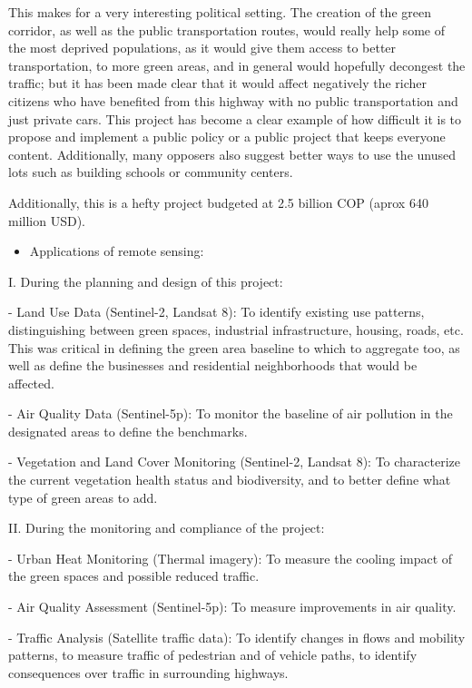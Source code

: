 \documentclass[
  letterpaper,
  DIV=11,
  numbers=noendperiod]{scrreprt}
\providecommand{\tightlist}{%
  \setlength{\itemsep}{0pt}\setlength{\parskip}{0pt}}\usepackage{longtable,booktabs,array}
\begin{document}
This makes for a very interesting political setting. The creation of the
green corridor, as well as the public transportation routes, would
really help some of the most deprived populations, as it would give them
access to better transportation, to more green areas, and in general
would hopefully decongest the traffic; but it has been made clear that
it would affect negatively the richer citizens who have benefited from
this highway with no public transportation and just private cars. This
project has become a clear example of how difficult it is to propose and
implement a public policy or a public project that keeps everyone
content. Additionally, many opposers also suggest better ways to use the
unused lots such as building schools or community centers.

Additionally, this is a hefty project budgeted at 2.5 billion COP (aprox
640 million USD).

\begin{itemize}
\tightlist
\item
  Applications of remote sensing:
\end{itemize}

I. During the planning and design of this project:

- Land Use Data (Sentinel-2, Landsat 8): To identify existing use
patterns, distinguishing between green spaces, industrial
infrastructure, housing, roads, etc. This was critical in defining the
green area baseline to which to aggregate too, as well as define the
businesses and residential neighborhoods that would be affected.

- Air Quality Data (Sentinel-5p): To monitor the baseline of air
pollution in the designated areas to define the benchmarks.

- Vegetation and Land Cover Monitoring (Sentinel-2, Landsat 8): To
characterize the current vegetation health status and biodiversity, and
to better define what type of green areas to add.

II. During the monitoring and compliance of the project:

- Urban Heat Monitoring (Thermal imagery): To measure the cooling impact
of the green spaces and possible reduced traffic.

- Air Quality Assessment (Sentinel-5p): To measure improvements in air
quality.

- Traffic Analysis (Satellite traffic data): To identify changes in
flows and mobility patterns, to measure traffic of pedestrian and of
vehicle paths, to identify consequences over traffic in surrounding
highways.
\end{document}
